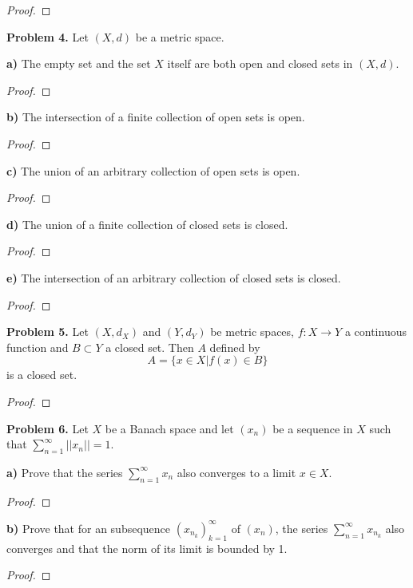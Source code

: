 \documentclass[12pt]{article}
\begin{document}
\begin{proof}
\end{proof}


\textbf{Problem 4.}
Let $(X, d)$ be a metric space.

\textbf{a)}
The empty set and the set $X$ itself are both open and closed sets in $(X,
d).$
\begin{proof}
\end{proof}

\textbf{b)}
The intersection of a finite collection of open sets is open.
\begin{proof}
\end{proof}

\textbf{c)}
The union of an arbitrary collection of open sets is open.
\begin{proof}
\end{proof}

\textbf{d)}
The union of a finite collection of closed sets is closed.
\begin{proof}
\end{proof}

\textbf{e)}
The intersection of an arbitrary collection of closed sets is closed.
\begin{proof}
\end{proof}


\textbf{Problem 5.}
Let $(X, d_X)$ and $(Y, d_Y)$ be metric spaces, $f: X \rightarrow Y$ a
continuous function and $B \subset Y$ a closed set. Then $A$ defined by
\[
    A = \{ x \in X | f(x) \in B \}
\]
is a closed set.
\begin{proof}
\end{proof}


\textbf{Problem 6.}
Let $X$ be a Banach space and let $(x_n)$ be a sequence in $X$ such that
$\sum_{n=1}^{\infty} ||x_n|| = 1$.

\textbf{a)}
Prove that the series $\sum_{n=1}^{\infty} x_n$ also converges to a limit $x \in X$.
\begin{proof}
\end{proof}

\textbf{b)}
Prove that for an subsequence $(x_{n_k})_{k=1}^{\infty}$ of $(x_n)$, the 
series $\sum_{n=1}^{\infty} x_{n_k}$ also converges and that the norm of
its limit is bounded by 1.
\begin{proof}
\end{proof}
\end{document}
